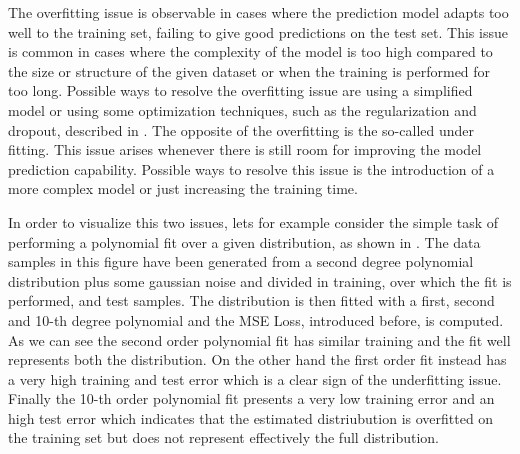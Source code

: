 The overfitting issue is observable in cases where the prediction model adapts too well to the training set, failing to give good predictions on the test set. This issue is common in cases where the complexity of the model is too high compared to the size or structure of the given dataset or when the training is performed for too long. Possible ways to resolve the overfitting issue are using a simplified model or using some optimization techniques, such as the regularization and dropout, described in .
The opposite of the overfitting is the so-called under fitting. This issue arises whenever there is still room for improving the model prediction capability. Possible ways to resolve this issue is the introduction of a more complex model or just increasing the training time.

In order to visualize this two issues, lets for example consider the simple task of performing a polynomial fit over a given distribution, as shown in  . The data samples in this figure have been generated from a second degree polynomial distribution plus some gaussian noise and divided in training, over which the fit is performed, and test samples. The distribution is then fitted with a first, second and 10-th degree polynomial and the MSE Loss, introduced before, is computed. As we can see the second order polynomial fit has similar training and the fit well represents both the distribution. On the other hand the first order fit instead has a very high training and test error which is a clear sign of the underfitting issue. Finally the 10-th order polynomial fit presents a very low training error and an high test error which indicates that the estimated distriubution is overfitted on the training set but does not represent effectively the full distribution.

